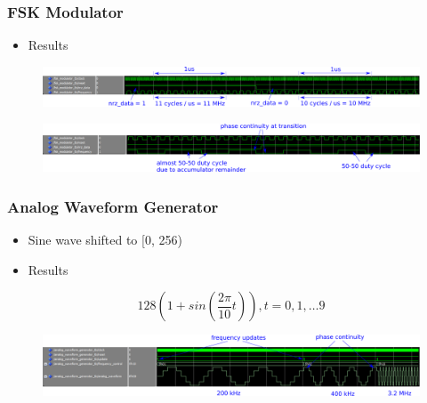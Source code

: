 \documentclass{beamer}
\begin{document}
\begin{frame}
\frametitle{FSK Modulator}

\begin{itemize}
    \item Results
\end{itemize}

\begin{figure}[!htb]
    \centering
    \includegraphics[width=\linewidth]{fsk_10_11_MHz.PNG}
\end{figure}
\begin{figure}[!htb]
    \centering
    \includegraphics[width=\linewidth]{fsk_50-50_phase.PNG}
\end{figure}

\end{frame}

\begin{frame}
\frametitle{Analog Waveform Generator}

\begin{itemize}
    \item Sine wave shifted to [0, 256)
    \item Results
\end{itemize}

\[ 128 (1 + sin(\frac{2 \pi}{10} t)), t = 0, 1, \ldots 9 \]

\begin{figure}[!htb]
    \centering
    \includegraphics[width=\linewidth]{analog.PNG}
\end{figure}

\end{frame}
\end{document}
